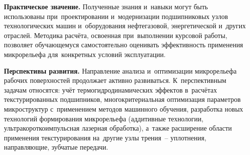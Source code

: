\textbf{Практическое значение.} Полученные знания и~навыки могут быть использованы при~проектировании и~модернизации подшипниковых узлов технологических машин и~оборудования нефтегазовой, энергетической и~других отраслей. Методика расчёта, освоенная при~выполнении курсовой работы, позволяет обучающемуся самостоятельно оценивать эффективность применения микрорельефа для~конкретных условий эксплуатации.

\textbf{Перспективы развития.} Направление анализа и~оптимизации микрорельефа рабочих поверхностей продолжает активно развиваться. К~перспективным задачам относятся: учёт термогидродинамических эффектов в~расчётах текстурированных подшипников, многокритериальная оптимизация параметров микроструктур с~применением методов машинного обучения, разработка новых технологий формирования микрорельефа (аддитивные технологии, ультракороткоимпульсная лазерная обработка), а~также расширение области применения текстурирования на~другие узлы трения~-- уплотнения, направляющие, зубчатые передачи.
